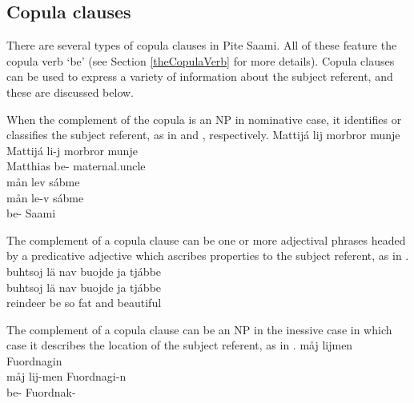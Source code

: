 \subsection{Copula clauses}\label{copulaClauses}
There are several types of copula clauses in Pite Saami. All of these feature the copula verb  ‘be’ %
(see Section \ref{theCopulaVerb} for more details). 
Copula clauses can be used to express a variety of information about the subject referent, and these are discussed below. 

When the complement of the copula is an NP in nominative case, it identifies or classifies the subject referent, as in  and , respectively.
\ea\label{copula1}
\glll	Mattijá lij morbror munje\\
	Mattijá li-j {morbror\footnotemark} munje\\
	Matthias\BS{} be- maternal.uncle\BS{} \\\nopagebreak
{} %
\z
\ea\label{copula2}
\glll	mån lev sábme\\
	mån le-v sábme\\
	 be- Saami\BS{}\\\nopagebreak
{} 
\z
{}

The complement of a copula clause can be one or more adjectival phrases headed by a predicative adjective which ascribes properties to the subject referent, as in .
\ea\label{copula3}
\glll	buhtsoj lä nav buojde ja tjábbe\\
	buhtsoj lä nav buojde ja tjábbe\\
	reindeer\BS{} be\BS{} so fat\BS{} and beautiful\BS{}\\\nopagebreak
{} 
\z

The complement of a copula clause can be an NP in the inessive case in which case it describes the location of the subject referent, as in .
\ea\label{copula4}
\glll	måj lijmen Fuordnagin\\
	måj lij-men Fuordnagi-n\\
	 be- Fuordnak-\\\nopagebreak
{} 
\z

